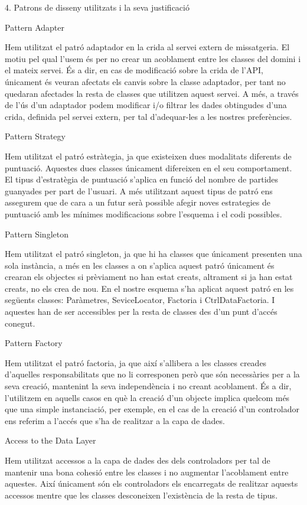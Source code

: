 4. Patrons de disseny utilitzats i la seva justificació

Pattern Adapter

Hem utilitzat el patró adaptador en la crida al servei extern de missatgeria. El motiu pel qual l’usem és per no crear un acoblament entre les classes del domini i el mateix servei. És a dir, en cas de modificació sobre la crida de l'API, únicament és veuran afectats els canvis sobre la classe adaptador, per tant no quedaran afectades la resta de classes que utilitzen aquest servei.
A més, a través de l’ús d’un adaptador podem modificar i/o filtrar les dades obtingudes d’una crida, definida pel servei extern, per tal d’adequar-les a les nostres preferències.

Pattern Strategy

Hem utilitzat el patró estràtegia, ja que existeixen dues modalitats diferents de puntuació. Aquestes dues classes únicament difereixen en el seu comportament. El tipus d’estratègia de puntuació s’aplica en funció del nombre de partides guanyades per part de l'usuari. A més utilitzant aquest tipus de patró ens assegurem que de cara a un futur serà possible afegir noves estrategies de puntuació amb les mínimes modificacions sobre l’esquema i el codi possibles.

Pattern Singleton

Hem utilitzat el patró singleton, ja que hi ha classes que únicament presenten una sola instància, a més en les classes a on s’aplica aquest patró únicament és crearan els objectes si prèviament no han estat creats, altrament si ja han estat creats, no els crea de nou.
En el nostre esquema s’ha aplicat aquest patró en les següents classes: Paràmetres, SeviceLocator, Factoria i CtrlDataFactoria. I aquestes han de ser accessibles per la resta de classes des d’un punt d’accés conegut.

Pattern Factory

Hem utilitzat el patró factoria, ja que així s’allibera a les classes creades d’aquelles responsabilitats que no li corresponen però que són necessàries per a la seva creació, mantenint la seva independència i no creant acoblament.
És a dir, l’utilitzem en aquells casos en què la creació d’un objecte implica quelcom més que una simple instanciació, per exemple, en el cas de la creació d’un controlador ens referim a l’accés que s’ha de realitzar a la capa de dades.

Access to the Data Layer

Hem utilitzat accessos a la capa de dades des dels controladors per tal de mantenir una bona cohesió entre les classes i no augmentar l’acoblament entre aquestes. Així únicament són els controladors els encarregats de realitzar aquests accessos mentre que les classes desconeixen l’existència de la resta de tipus.
